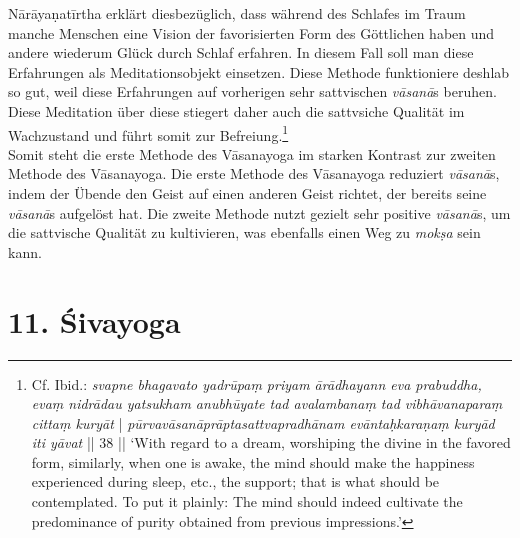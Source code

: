 Nārāyaṇatīrtha erklärt diesbezüglich, dass während des Schlafes im Traum manche Menschen eine Vision der favorisierten Form des Göttlichen haben und andere wiederum Glück durch Schlaf erfahren. In diesem Fall soll man diese Erfahrungen als Meditationsobjekt einsetzen. Diese Methode funktioniere deshlab so gut, weil diese Erfahrungen auf vorherigen sehr sattvischen \textit{vāsanā}s beruhen. Diese Meditation über diese stiegert daher auch die sattvsiche Qualität im Wachzustand und führt somit zur Befreiung.\footnote{Cf. Ibid.: \textit{svapne bhagavato yadrūpaṃ priyam ārādhayann eva prabuddha, evaṃ nidrādau yatsukham anubhūyate tad avalambanaṃ tad vibhāvanaparaṃ cittaṃ kuryāt} | \textit{pūrvavāsanāprāptasattvapradhānam evāntaḥkaraṇaṃ kuryād iti yāvat} || 38 || `With regard to a dream, worshiping the divine in the favored form, similarly, when one is awake, the mind should make the happiness experienced during sleep, etc., the support; that is what should be contemplated. To put it plainly: The mind should indeed cultivate the predominance of purity obtained from previous impressions.'}\\

Somit steht die erste Methode des Vāsanayoga im starken Kontrast zur zweiten Methode des Vāsanayoga. Die erste Methode des Vāsanayoga reduziert \textit{vāsanā}s, indem der Übende den Geist auf einen anderen Geist richtet, der bereits seine \textit{vāsanā}s aufgelöst hat. Die zweite Methode nutzt gezielt sehr positive \textit{vāsanā}s, um die sattvische Qualität zu kultivieren, was ebenfalls einen Weg zu \textit{mokṣa} sein kann.   


\section{11. Śivayoga}
\label{sivayogaintro}

